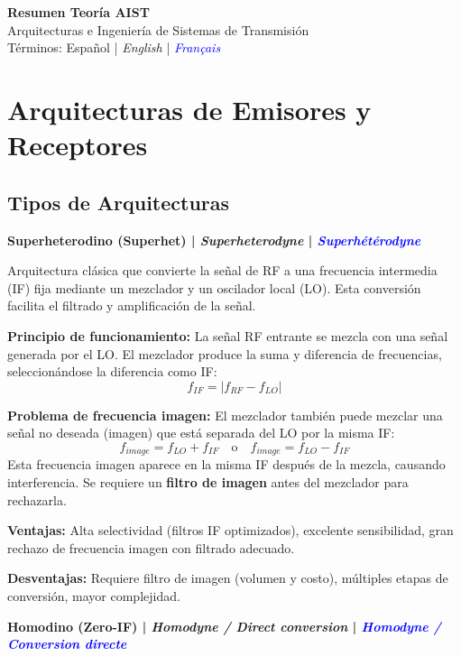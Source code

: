 \documentclass[a4paper,10pt]{article}
\begin{document}
\begin{center}
{\LARGE\bfseries Resumen Teor\'ia AIST}\\[0.3cm]
{\large Arquitecturas e Ingenier\'ia de Sistemas de Transmisi\'on}\\[0.2cm]
{\normalsize T\'erminos: Espa\~nol | \textit{English} | \textcolor{blue}{\textit{Fran\c{c}ais}}}
\end{center}

\tableofcontents
\newpage

\section{Arquitecturas de Emisores y Receptores}

\subsection{Tipos de Arquitecturas}

\textbf{Superheterodino (Superhet) | \textit{Superheterodyne} | \textcolor{blue}{\textit{Superh\'et\'erodyne}}}

Arquitectura cl\'asica que convierte la se\~nal de RF a una frecuencia intermedia (IF) fija mediante un mezclador y un oscilador local (LO). Esta conversi\'on facilita el filtrado y amplificaci\'on de la se\~nal.

\textbf{Principio de funcionamiento:} La se\~nal RF entrante se mezcla con una se\~nal generada por el LO. El mezclador produce la suma y diferencia de frecuencias, seleccion\'andose la diferencia como IF:
$$f_{IF} = |f_{RF} - f_{LO}|$$

\textbf{Problema de frecuencia imagen:} El mezclador tambi\'en puede mezclar una se\~nal no deseada (imagen) que est\'a separada del LO por la misma IF:
$$f_{image} = f_{LO} + f_{IF} \quad \text{o} \quad f_{image} = f_{LO} - f_{IF}$$
Esta frecuencia imagen aparece en la misma IF despu\'es de la mezcla, causando interferencia. Se requiere un \textbf{filtro de imagen} antes del mezclador para rechazarla.

\textbf{Ventajas:} Alta selectividad (filtros IF optimizados), excelente sensibilidad, gran rechazo de frecuencia imagen con filtrado adecuado.

\textbf{Desventajas:} Requiere filtro de imagen (volumen y costo), m\'ultiples etapas de conversi\'on, mayor complejidad.

\textbf{Homodino (Zero-IF) | \textit{Homodyne / Direct conversion} | \textcolor{blue}{\textit{Homodyne / Conversion directe}}}
\end{document}
